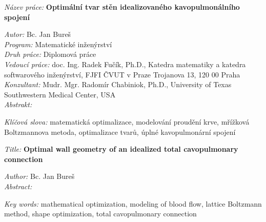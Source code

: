 
%
\begin{onehalfspace}
\noindent \emph{Název práce:}
\noindent \textbf{Optimální tvar stěn idealizovaného kavopulmonálního spojení}
\end{onehalfspace}
\noindent \emph{Autor:} Bc. Jan Bureš\\[2pt]
\noindent \emph{Program:} Matematické inženýrství\\[2pt]
\noindent \emph{Druh práce:} Diplomová práce\\[2pt]
\noindent \emph{Vedoucí práce:} doc. Ing. Radek Fučík, Ph.D.,
Katedra matematiky a katedra softwarového inženýrství, FJFI ČVUT v Praze
Trojanova 13, 120 00 Praha\\[2pt]
\noindent \emph{Konzultant:} Mudr. Mgr. Radomír Chabiniok, Ph.D., University of Texas Southwestern Medical Center, USA\\[2pt]
\noindent \emph{Abstrakt:} \lipsum[1]\lipsum[2]

\bigskip{}

\noindent \emph{Klíčová slova:} matematická optimalizace, modelování proudění krve, mřížková Boltzmannova metoda, optimalizace tvarů, úplné kavopulmonární spojení
\vfill{}
~

%
\begin{onehalfspace}
\noindent \emph{Title:}
\noindent \textbf{Optimal wall geometry of an idealized total cavopulmonary connection}
\end{onehalfspace}
\noindent \emph{Author:} Bc. Jan Bureš\\[2pt]
\noindent \emph{Abstract:} \lipsum[1]\lipsum[2]

\bigskip{}

\noindent \emph{Key words:} mathematical optimization, modeling of blood flow, lattice Boltzmann method, shape optimization, total cavopulmonary connection

